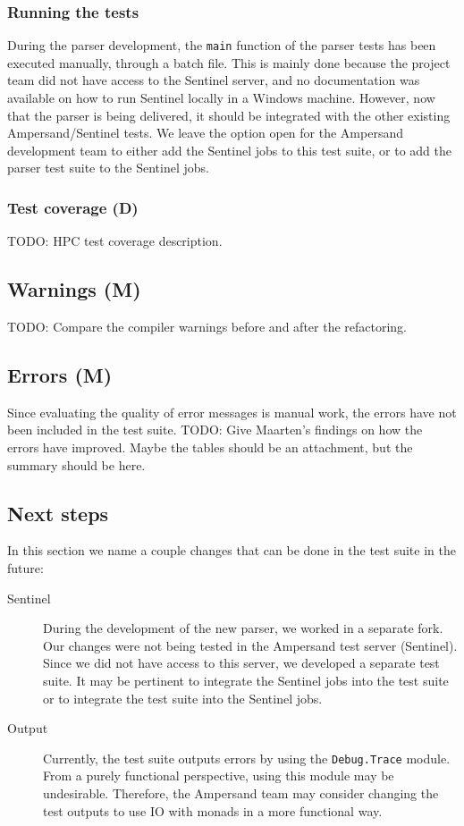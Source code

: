   \subsubsection{Running the tests}
  During the parser development, the \texttt{main} function of the parser tests has been executed manually, through a batch file.
  This is mainly done because the project team did not have access to the Sentinel server, and no documentation was available on how to run Sentinel locally in a Windows machine.
  However, now that the parser is being delivered, it should be integrated with the other existing Ampersand/Sentinel tests.
  We leave the option open for the Ampersand development team to either add the Sentinel jobs to this test suite, or to add the parser test suite to the Sentinel jobs.
  
  \subsubsection{Test coverage (D)}
  TODO: HPC test coverage description.
  
\subsection{Warnings (M)}
TODO: Compare the compiler warnings before and after the refactoring.

\subsection{Errors (M)}
  Since evaluating the quality of error messages is manual work, the errors have not been included in the test suite.
  TODO: Give Maarten's findings on how the errors have improved. Maybe the tables should be an attachment, but the summary should be here.

\subsection{Next steps}
  In this section we name a couple changes that can be done in the test suite in the future:
  \begin{description}
    \item[Sentinel] During the development of the new parser, we worked in a separate fork.
      Our changes were not being tested in the Ampersand test server (Sentinel).
      Since we did not have access to this server, we developed a separate test suite.
      It may be pertinent to integrate the Sentinel jobs into the test suite or to integrate the test suite into the Sentinel jobs.
    
    \item[Output] Currently, the test suite outputs errors by using the \texttt{Debug.Trace} module.
      From a purely functional perspective, using this module may be undesirable.
      Therefore, the Ampersand team may consider changing the test outputs to use IO with monads in a more functional way.
  \end{description}

